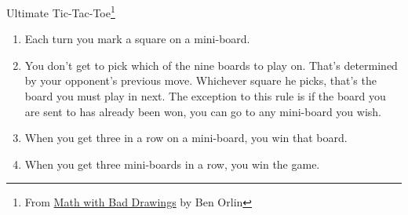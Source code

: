 {\Large Ultimate Tic-Tac-Toe\footnote{From \underline{Math with Bad Drawings} by Ben Orlin}}

\begin{enumerate}
	\item Each turn you mark a square on a mini-board.
	\item You don’t get to pick which of the nine boards to play on. That’s determined by your opponent’s previous move. Whichever square he picks, that’s the board you must play in next.  The exception to this rule is if the board you are sent to has already been won, you can go to any mini-board you wish.
	\item When you get three in a row on a mini-board, you win that board.
	\item When you get three mini-boards in a row, you win the game.
\end{enumerate}
\vspace{1cm}
\centering

